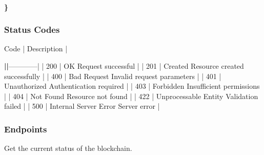 \documentclass[letterpaper,10pt,english]{sphinxmanual}
\begin{document}
\paragraph{\}}
\label{\detokenize{api/rest-api:id10}}

\subsubsection{Status Codes}
\label{\detokenize{api/rest-api:status-codes}}
\begin{DUlineblock}{0em}
\item[] Code | Description |
\end{DUlineblock}

\sphinxAtStartPar
{\color{red}\bfseries{}|\sphinxhyphen{}\sphinxhyphen{}\sphinxhyphen{}\sphinxhyphen{}\sphinxhyphen{}\sphinxhyphen{}|}————\sphinxhyphen{}|
| 200 | OK \sphinxhyphen{} Request successful |
| 201 | Created \sphinxhyphen{} Resource created successfully |
| 400 | Bad Request \sphinxhyphen{} Invalid request parameters |
| 401 | Unauthorized \sphinxhyphen{} Authentication required |
| 403 | Forbidden \sphinxhyphen{} Insufficient permissions |
| 404 | Not Found \sphinxhyphen{} Resource not found |
| 422 | Unprocessable Entity \sphinxhyphen{} Validation failed |
| 500 | Internal Server Error \sphinxhyphen{} Server error |


\subsubsection{Endpoints}
\label{\detokenize{api/rest-api:endpoints}}
\sphinxAtStartPar
Get the current status of the blockchain.

\sphinxAtStartPar
{} 
\end{document}
